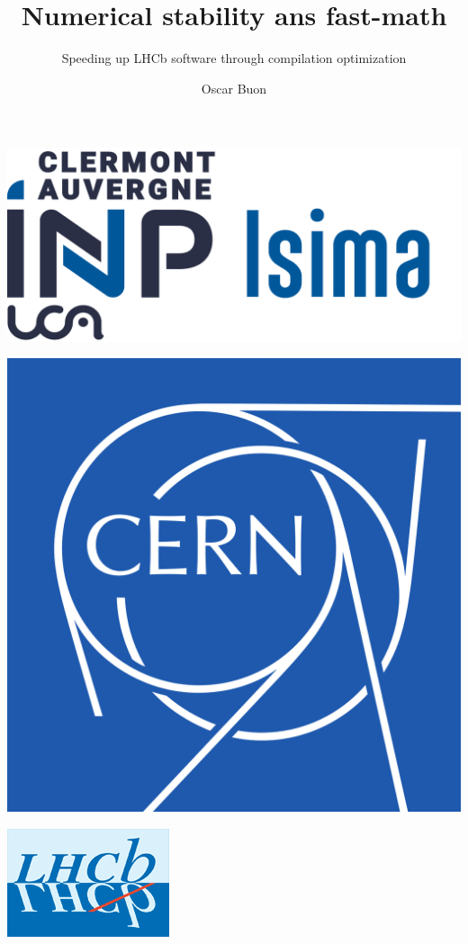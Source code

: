 \documentclass{beamer}
\title{Numerical stability ans fast-math}
\subtitle{Speeding up LHCb software through compilation optimization}
\author{Oscar Buon}
\begin{document}
\begin{frame}
    \centering
    \begin{minipage}{0.2\textwidth}
        \includegraphics[width=\textwidth]{logo_ISIMA_INP.png}
    \end{minipage}\hfill
    \begin{minipage}{0.2\textwidth}
        \includegraphics[width=\textwidth]{logo_CERN.png}
    \end{minipage}\hfill
    \begin{minipage}{0.2\textwidth}
        \includegraphics[width=\textwidth]{logo_LHCb.png}
    \end{minipage}


\end{frame}
\end{document}
